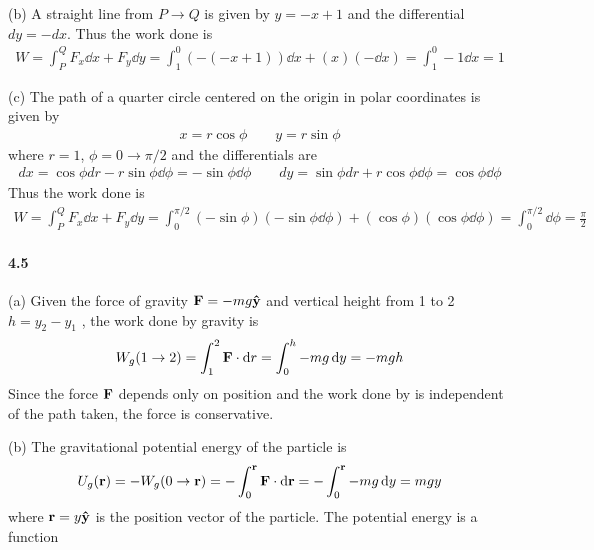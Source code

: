 \documentclass[../problems.tex]{subfiles}
\begin{document}
(b) A straight line from $P \to Q$ is given by $y = -x + 1$ and the differential $dy = -dx$. Thus
the work done is
\begin{align*}
    W = \int_P^Q F_x \dd{x} + F_y \dd{y} 
    = \int_1^0 (-(-x+1)) \dd{x} + (x) (-\dd{x}) = \int_1^0 -1 \dd{x} = 1
\end{align*}

(c) The path of a quarter circle centered on the origin in polar coordinates is given by
\begin{align*}
    x = r \cos \phi \qquad y = r \sin \phi
\end{align*}
where $r=1$, $\phi = 0 \to \pi/2$ and the differentials are
\begin{align*}
    dx = \cos \phi d{r} - r \sin \phi \dd{\phi} = - \sin \phi \dd{\phi} \qquad
    dy = \sin \phi d{r} + r \cos \phi \dd{\phi} = \cos \phi \dd{\phi}
\end{align*}
Thus the work done is
\begin{align*}
    W = \int_P^Q F_x \dd{x} + F_y \dd{y} 
    = \int_0^{\pi/2} (-\sin \phi) (-\sin \phi \dd{\phi}) + (\cos \phi) (\cos \phi \dd{\phi})
    = \int_0^{\pi/2} \dd\phi = \frac{\pi}{2}
\end{align*}

\paragraph{4.5}
(a) Given the force of gravity $\vb{F} = -mg \vu{y}$ and vertical height from 1 to 2 $h = y_2 - y_1$
, the work done by gravity is 
\begin{align*}
    W_{g}(1 \to 2) = \int_1^2 \vb{F} \cdot \dd{r} = \int_0^h -mg \dd{y} = -mgh
\end{align*}
Since the force $\vb{F}$ depends only on position and the work done by is independent of the path
taken, the force is conservative.

(b) The gravitational potential energy of the particle is 
\begin{align*}
    U_g(\vb{r}) = - W_g(0 \to \vb{r}) = - \int_0^{\vb{r}} \vb{F} \cdot \dd{\vb{r}} 
    = - \int_0^{\vb{r}} -mg \dd{y} = mgy
\end{align*}
where $\vb{r} = y\vu{y}$ is the position vector of the particle. The potential energy is a function
\end{document}
